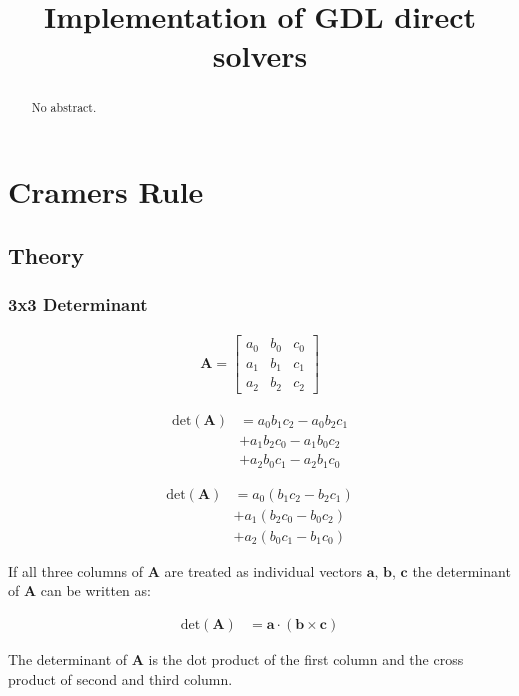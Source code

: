 \documentclass[fontsize = 10pt,DIV = 13]{scrartcl}
\title{Implementation of GDL direct solvers}
\newcommand{\pth}[1]{\left(#1\right)}
\begin{document}
\maketitle

\begin{abstract}
No abstract.
\end{abstract}

\section{Cramers Rule}
\subsection{Theory}

\subsubsection{3x3 Determinant}
\begin{align*}
\mathbf{A}
=
\begin{bmatrix}
a_0&b_0&c_0\\
a_1&b_1&c_1\\
a_2&b_2&c_2
\end{bmatrix}
\end{align*}

\begin{align*}
\mathrm{det}\pth{\mathbf{A}}
&
= a_0b_1c_2 - a_0b_2c_1 
\\&
+ a_1b_2c_0 - a_1b_0c_2 
\\&
+ a_2b_0c_1 - a_2b_1c_0
\end{align*}

\begin{align*}
\mathrm{det}\pth{\mathbf{A}}
&
= a_0\pth{b_1c_2 - b_2c_1}
\\&
+ a_1\pth{b_2c_0 - b_0c_2}
\\&
+ a_2\pth{b_0c_1 - b_1c_0}
\end{align*}

If all three columns of $\mathbf{A}$ are treated as individual vectors $\mathbf{a}$, $\mathbf{b}$, $\mathbf{c}$ the determinant of $\mathbf{A}$ can be written as:

\begin{align}
\label{eq:determinant3x3}
\mathrm{det}\pth{\mathbf{A}}
&
= \mathbf{a} \cdot \pth{\mathbf{b} \times \mathbf{c}}
\end{align}

The determinant of  $\mathbf{A}$ is the dot product of the first column and the cross product of second and third column.
\end{document}
